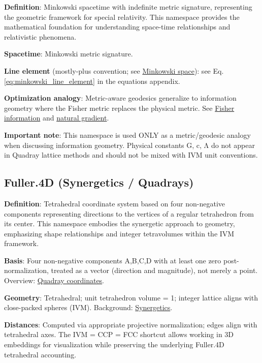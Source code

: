 \documentclass[
  10pt,
]{article}
\begin{document}
\textbf{Definition}: Minkowski spacetime with indefinite metric
signature, representing the geometric framework for special relativity.
This namespace provides the mathematical foundation for understanding
space-time relationships and relativistic phenomena.

\textbf{Spacetime}: Minkowski metric signature.

\textbf{Line element} (mostly-plus convention; see
\href{https://en.wikipedia.org/wiki/Minkowski_space}{Minkowski space}):
see Eq. \eqref{eq:minkowski_line_element} in the equations appendix.

\textbf{Optimization analogy}: Metric-aware geodesics generalize to
information geometry where the Fisher metric replaces the physical
metric. See
\href{https://en.wikipedia.org/wiki/Fisher_information}{Fisher
information} and
\href{https://en.wikipedia.org/wiki/Natural_gradient}{natural gradient}.

\textbf{Important note}: This namespace is used ONLY as a
metric/geodesic analogy when discussing information geometry. Physical
constants G, c, Λ do not appear in Quadray lattice methods and should
not be mixed with IVM unit conventions.

\hypertarget{fuller.4d-synergetics-quadrays}{%
\subsection{Fuller.4D (Synergetics /
Quadrays)}\label{fuller.4d-synergetics-quadrays}}

\textbf{Definition}: Tetrahedral coordinate system based on four
non-negative components representing directions to the vertices of a
regular tetrahedron from its center. This namespace embodies the
synergetic approach to geometry, emphasizing shape relationships and
integer tetravolumes within the IVM framework.

\textbf{Basis}: Four non-negative components A,B,C,D with at least one
zero post-normalization, treated as a vector (direction and magnitude),
not merely a point. Overview:
\href{https://en.wikipedia.org/wiki/Quadray_coordinates}{Quadray
coordinates}.

\textbf{Geometry}: Tetrahedral; unit tetrahedron volume = 1; integer
lattice aligns with close-packed spheres (IVM). Background:
\href{https://en.wikipedia.org/wiki/Synergetics_(Fuller)}{Synergetics}.

\textbf{Distances}: Computed via appropriate projective normalization;
edges align with tetrahedral axes. The IVM = CCP = FCC shortcut allows
working in 3D embeddings for visualization while preserving the
underlying Fuller.4D tetrahedral accounting.
\end{document}
